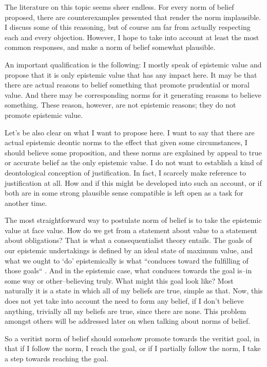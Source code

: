 \documentclass[12pt,numbers=noenddot]{scrartcl}
\begin{document}
The literature on this topic seems sheer endless. For every norm of belief proposed, there are counterexamples presented that render the norm implausible. I discuss some of this reasoning, but of course am far from actually respecting each and every objection. However, I hope to take into account at least the most common responses, and make a norm of belief somewhat plausible.

An important qualification is the following: I mostly speak of epistemic value and propose that it is only epistemic value that has any impact here. It may be that there are actual reasons to belief something that promote prudential or moral value. And there may be corresponding norms for it generating reasons to believe something. These reason, however, are not epistemic reasons; they do not promote epistemic value.

Let's be also clear on what I want to propose here. I want to say that there are actual epistemic deontic norms to the effect that given some circumstances, I should believe some proposition, and these norms are explained by appeal to true or accurate belief as the only epistemic value. I do not want to establish a kind of deontological conception of justification. In fact, I scarcely make reference to justification at all. How and if this might be developed into such an account, or if both are in some strong plausible sense compatible is left open as a task for another time.

The most straightforward way to postulate norm of belief is to take the epistemic value at face value. How do we get from a statement about value to a statement about obligations? That is what a consequentialist theory entails. The goals of our epistemic undertakings is defined by an ideal state of maximum value, and what we ought to ‘do’ epistemically is what “conduces toward the fulfilling of those goals“ \autocite[340]{Berker2013-BERETA-2}. And in the epistemic case, what conduces towards the goal is–in some way or other–believing truly. What might this goal look like? Most naturally it is a state in which all of my beliefs are true, simple as that. Now, this does not yet take into account the need to form any belief, if I don't believe anything, trivially all my beliefs are true, since there are none. This problem amongst others will be addressed later on when talking about norms of belief.

So a veritist norm of belief should somehow promote towards the veritist goal, in that if I follow the norm, I reach the goal, or if I partially follow the norm, I take a step towards reaching the goal.
\end{document}
